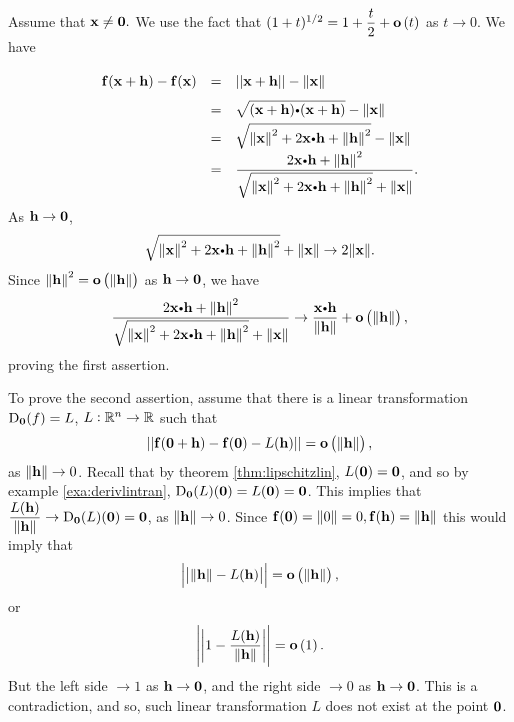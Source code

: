 \begin{Answer}{3.5}
 Assume that $\mathbf{ x} \neq
\mathbf{ 0}.$ We use the fact that $(1 + t)^{1/2} = 1 + \dfrac{t}{2}
+ {\mathbf o}\left(t\right)$ as $t \rightarrow 0$. We have
$$\renewcommand{\arraystretch}{1.7}
{\everymath{\displaystyle}\begin{array}{lll} \funvect{f}(\vector{x} +
\vector{h}) - \funvect{f}(\vector{x}) & = & ||\vector{x}+\vector{h}|| - \norm{\vector{x}}  \\
& = & \sqrt{(\vector{x} + \vector{h})\bp (\vector{x} + \vector{h})} - \norm{\vector{x}} \\
& = & \sqrt{\norm{\vector{x}}^2 + 2\vector{x}\bp\vector{h}+
\norm{\vector{h}}^2} - \norm{\vector{x}}
\\
& = & \dfrac{2\dotprod{x}{h}+
\norm{\vector{h}}^2}{\sqrt{\norm{\vector{x}}^2 +
2\vector{x}\bp\vector{h}+ \norm{\vector{h}}^2}  + \norm{\vector{x}}}.\\
\end{array}}$$\renewcommand{\arraystretch}{1}
As $\mathbf{ h} \rightarrow \mathbf{ 0}$,
$$\sqrt{\norm{\vector{x}}^2 +
2\vector{x}\bp\vector{h}+ \norm{\vector{h}}^2}  + \norm{\vector{x}}
\rightarrow 2\norm{\vector{x}}.$$Since ${\left\|\mathbf{ h}\right\|}^2 =
{\mathbf o}\left({\left\|\mathbf{ h}\right\|}\right)$ as $\mathbf{ h} \rightarrow
\mathbf{ 0}$, we have
$$\dfrac{2\dotprod{x}{h}+ \norm{\vector{h}}^2}{\sqrt{\norm{\vector{x}}^2 +
2\vector{x}\bp\vector{h}+ \norm{\vector{h}}^2}  + \norm{\vector{x}}}
\rightarrow \dfrac{\vector{x}\bp\vector{h}}{\norm{\vector{h}}} +
\smallosans{\norm{\vector{h}}},$$proving the first assertion.



      To prove the second assertion, assume that there is a linear
transformation ${\mathrm{D}}_{{\mathbf 0}}(f) = L$,   $L:\mathbb{R}^n \rightarrow \mathbb{R}$
such that
$$||\mathbf{ f}(\mathbf{ 0} + \mathbf{ h}) - \mathbf{ f}(\mathbf{ 0}) - L(\mathbf{ h})|| = {\mathbf o}\left({\left\|\mathbf{ h}\right\|}\right),$$as ${\left\|\mathbf{ h}\right\|}\rightarrow
0$.  Recall that by theorem \ref{thm:lipschitzlin}, $L(\mathbf{ 0}) =
\mathbf{ 0}$, and so by example \ref{exa:derivlintran},
${\mathrm{D}}_{{\mathbf 0}}(L)(\mathbf{ 0}) = L(\mathbf{ 0}) = \mathbf{ 0}$. This
implies that $\displaystyle{\dfrac{L(\mathbf{ h})}{{\left\|\mathbf{ h}\right\|}}}
\rightarrow {\mathrm{D}}_{{\mathbf 0}}(L)(\mathbf{ 0}) = \mathbf{ 0}$, as
${\left\|\mathbf{ h}\right\|}\rightarrow 0$. Since $\mathbf{ f}(\mathbf{ 0}) = {\left\|0\right\|} =
0, \mathbf{ f}(\mathbf{ h}) = {\left\|\mathbf{ h}\right\|}$ this would imply that
$$\left|\left|{\left\|\mathbf{ h}\right\|} - L(\mathbf{ h})\right|\right| = {\mathbf o}\left({\left\|\mathbf{ h}\right\|}\right),$$or
$$\left|\left| 1 -  \dfrac{L(\mathbf{ h})}{{\left\|\mathbf{ h}\right\|}}\right|\right| = {\mathbf o}\left(1\right).$$
But the left side $\rightarrow 1$ as $\mathbf{ h} \rightarrow
\mathbf{ 0}$, and the right side $\rightarrow 0$ as $\mathbf{ h}
\rightarrow \mathbf{ 0}$. This is a contradiction, and so, such
linear transformation $L$ does not exist at the point $\mathbf{ 0}$.
\end{Answer}
